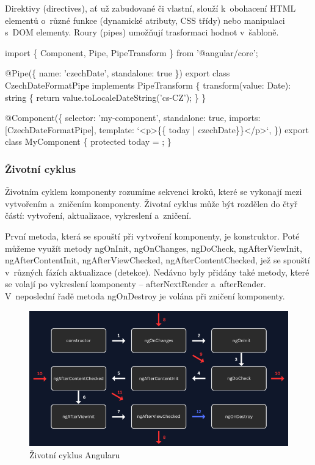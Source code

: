 Direktivy (directives), ať už zabudované či vlastní, slouží k~obohacení HTML elementů o~různé funkce (dynamické atributy, CSS třídy) nebo manipulaci s~DOM elementy. 
Roury (pipes) umožňují trasformaci hodnot v~šabloně.\cite{angulardev,angulario}

\begin{prog}
import \{ Component, Pipe, PipeTransform \} from '@angular/core';

@Pipe(\{ name: 'czechDate', standalone: true \})
export class CzechDateFormatPipe implements PipeTransform \{
  transform(value: Date): string \{
    return value.toLocaleDateString('cs-CZ');
  \}
\}

@Component(\{
  selector: 'my-component',
  standalone: true,
  imports: [CzechDateFormatPipe],
  template: `<p>\{\{ today | czechDate\}\}</p>`,
\})
export class MyComponent \{
  protected today = ;
\}
\end{prog}

\subsubsection{Životní cyklus}

Životním cyklem komponenty rozumíme sekvenci kroků, které se vykonají mezi vytvořením a~zničením komponenty. 
Životní cyklus může být rozdělen do čtyř částí: vytvoření, aktualizace, vykreslení a~zničení. 

První metoda, která se spouští při vytvoření komponenty, je konstruktor. 
Poté můžeme využít metody ngOnInit, ngOnChanges, ngDoCheck, ngAfterViewInit, ngAfterContentInit, ngAfterViewChecked, ngAfterContentChecked, jež se spouští v~různých fázích aktualizace (detekce). 
Nedávno byly přidány také metody, které se volají po vykreslení komponenty -- afterNextRender a~afterRender. 
V~neposlední řadě metoda ngOnDestroy je volána při zničení komponenty.\cite{angulardev,learningangular}

\begin{figure}[htb]
	\centering
		\includegraphics[width=.85\textwidth]{images/angularlifecycle.png}
	\caption[Životní cyklus Angularu]{Životní cyklus Angularu \cite{angularlifecycle}}
	\label{fig:angularlifecycle}
\end{figure}

